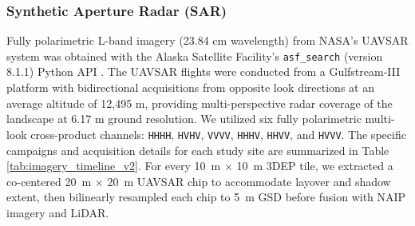 \documentclass[remotesensing,article,accept,pdftex,moreauthors]{Definitions/mdpi}
\begin{document}
\subsubsection{Synthetic Aperture Radar (SAR)}
Fully polarimetric L-band imagery (23.84 cm wavelength) from NASA’s UAVSAR system was obtained with the Alaska Satellite Facility’s \texttt{asf\_search} (version 8.1.1) Python %
 API \citep{alaska_search}. The UAVSAR flights were conducted from a Gulfstream-III platform with bidirectional acquisitions from opposite look directions at an average altitude of 12,495 m, providing multi-perspective radar coverage of the landscape at 6.17 m ground resolution. We utilized six fully polarimetric multi-look cross-product channels: \texttt{HHHH}, \texttt{HVHV}, \texttt{VVVV}, \texttt{HHHV}, \texttt{HHVV}, and \texttt{HVVV}. The specific campaigns and acquisition details for each study site are summarized in Table \ref{tab:imagery_timeline_v2}. For every \SI{10}{m} × \SI{10}{m} 3DEP tile, we extracted a co-centered \SI{20}{m} × \SI{20}{m} UAVSAR chip to accommodate layover and shadow extent, then bilinearly resampled each chip to \SI{5}{m} GSD before fusion with NAIP imagery and LiDAR.
\end{document}
